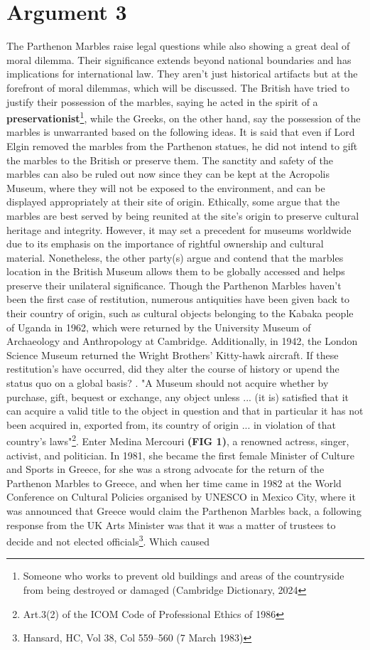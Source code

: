 \documentclass[12pt, letterpaper]{article}
\begin{document}
\section*{Argument 3}
The Parthenon Marbles raise legal questions while also showing a great deal of moral dilemma. Their significance extends beyond national boundaries and has implications for international law. They aren’t just historical artifacts but at the forefront of moral dilemmas, which will be discussed. The British have tried to justify their possession of the marbles, saying he acted in the spirit of a \textbf{preservationist}\footnote{Someone who works to prevent old buildings and areas of the countryside from being destroyed or damaged (Cambridge Dictionary, 2024}, while the Greeks, on the other hand, say the possession of the marbles is unwarranted based on the following ideas. It is said that even if Lord Elgin removed the marbles from the Parthenon statues, he did not intend to gift the marbles to the British or preserve them. The sanctity and safety of the marbles can also be ruled out now since they can be kept at the Acropolis Museum, where they will not be exposed to the environment, and can be displayed appropriately at their site of origin. Ethically, some argue that the marbles are best served by being reunited at the site's origin to preserve cultural heritage and integrity. However, it may set a precedent for museums worldwide due to its emphasis on the importance of rightful ownership and cultural material. Nonetheless, the other party(s) argue and contend that the marbles location in the British Museum allows them to be globally accessed and helps preserve their unilateral significance. Though the Parthenon Marbles haven't been the first case of restitution, numerous antiquities have been given back to their country of origin, such as cultural objects belonging to the Kabaka people of Uganda in 1962, which were returned by the University Museum of Archaeology and Anthropology at Cambridge. Additionally,  in 1942, the London Science Museum returned the Wright Brothers' Kitty-hawk aircraft. If these restitution's have occurred, did they alter the course of history or upend the status quo on a global basis? . "A Museum should not acquire whether by purchase, gift, bequest or exchange, any object unless ... (it is) satisfied that it can acquire a valid title to the object in question and that in particular it has not been acquired in, exported from, its country of origin ... in violation of that country's laws"\footnote{Art.3(2) of the ICOM Code of Professional Ethics of 1986}. Enter Medina Mercouri \textbf{(FIG 1)}, a renowned  actress, singer, activist, and politician. In 1981, she became the first female Minister of Culture and Sports in Greece, for she was a strong advocate for the return of the Parthenon Marbles to Greece, and when her time came in 1982 at the World Conference on Cultural Policies organised by UNESCO in Mexico City, where it was announced that Greece would claim the Parthenon Marbles back, a following response from the UK Arts Minister was that it was a matter of trustees to decide and not elected officials\footnote{Hansard, HC, Vol 38, Col 559–560 (7 March 1983)}. Which caused 
\end{document}
